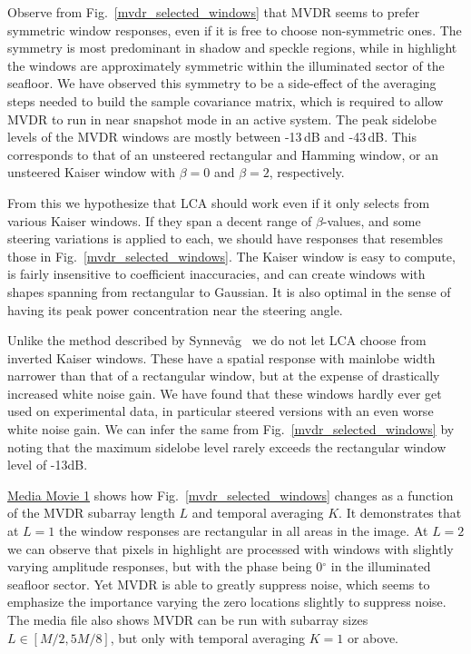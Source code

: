 \documentclass[10pt,journal,draftclsnofoot,onecolumn]{IEEEtran}
\newcommand\Fig[1]{Fig.~\ref{#1}}
\newcommand\1{\vec 1}
\newcommand\multimedia[2]{\href{#1}{#2}}
\newcommand\mediaPath{gfx/media}
\newcommand\mediaI{\multimedia{\mediaPath/media1.mp4}{Media Movie 1}}
\begin{document}
Observe from \Fig{mvdr_selected_windows} that MVDR seems to prefer symmetric window responses, even if it is free to choose non-symmetric ones. The symmetry is most predominant in shadow and speckle regions, while in highlight the windows are approximately symmetric within the illuminated sector of the seafloor. We have observed this symmetry to be a side-effect of the averaging steps needed to build the sample covariance matrix, which is required to allow MVDR to run in near snapshot mode in an active system. The peak sidelobe levels of the MVDR windows are mostly between -13\,dB and -43\,dB. This corresponds to that of an unsteered rectangular and Hamming window, or an unsteered Kaiser window with $\beta=0$ and $\beta=2$, respectively.

From this we hypothesize that LCA should work even if it only selects from various Kaiser windows. If they span a decent range of $\beta$-values, and some steering variations is applied to each, we should have responses that resembles those in \Fig{mvdr_selected_windows}. The Kaiser window is easy to compute, is fairly insensitive to coefficient inaccuracies, and can create windows with shapes spanning from rectangular to Gaussian. It is also optimal in the sense of having its peak power concentration near the steering angle.

Unlike the method described by Synnev\aa{}g~\cite{Synnevag2008} we do not let LCA choose from  inverted Kaiser windows. These have a spatial response with mainlobe width narrower than that of a rectangular window, but at the expense of drastically increased white noise gain. We have found that these windows hardly ever get used on experimental data, in particular steered versions with an even worse white noise gain. We can infer the same from \Fig{mvdr_selected_windows} by noting that the maximum sidelobe level rarely exceeds the rectangular window level of -13\;dB.

\mediaI{} shows how \Fig{mvdr_selected_windows} changes as a function of the MVDR subarray length $L$ and temporal averaging $K$. It demonstrates that at $L=1$ the window responses are rectangular in all areas in the image. At $L=2$ we can observe that pixels in highlight are processed with windows with slightly varying amplitude responses, but with the phase being 0$^\circ$ in the illuminated seafloor sector. Yet MVDR is able to greatly suppress noise, which seems to emphasize the importance varying the zero locations slightly to suppress noise. The media file also shows MVDR can be run with subarray sizes $L\in[M/2,5M/8]$, but only with temporal averaging $K=1$ or above.
\end{document}
